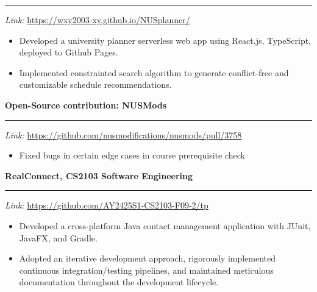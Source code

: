 \documentclass{article}
\begin{document}
\indent\rule{\linewidth}{0.4pt} %
\indent\textit{Link:} \href{https://wxy2003-xy.github.io/NUSplanner/}{https://wxy2003-xy.github.io/NUSplanner/} \\
\indent\vspace{-0.4cm} 
\begin{adjustwidth}{2.5em}{0pt}
\begin{itemize}[leftmargin=*, itemsep=1pt, parsep=0pt]
  \item \indent Developed a university planner serverless web app using React.js, TypeScript, deployed to Github Pages.
  \item \indent Implemented constrainted search algorithm to generate conflict-free and customizable schedule recommendations.
\end{itemize}
\end{adjustwidth}

\indent \textbf{Open-Source contribution: NUSMods} \\
\vspace{-0.7cm} %

\indent\rule{\linewidth}{0.4pt} %
\indent\textit{Link:} \href{https://github.com/nusmodifications/nusmods/pull/3758}{https://github.com/nusmodifications/nusmods/pull/3758} \\
\indent\vspace{-0.4cm} 
\begin{adjustwidth}{2.5em}{0pt}
\begin{itemize}[leftmargin=*, itemsep=1pt, parsep=0pt]
  \item \indent Fixed bugs in certain edge cases in course prerequisite check 
\end{itemize}
\end{adjustwidth}

\indent \textbf{RealConnect, CS2103 Software Engineering} \\
\vspace{-0.7cm} %

\indent\rule{\linewidth}{0.4pt} %
\indent\textit{Link:} \href{https://github.com/AY2425S1-CS2103-F09-2/tp}{https://github.com/AY2425S1-CS2103-F09-2/tp} \\
\vspace{-0.4cm}
\begin{adjustwidth}{2.5em}{0pt}
\begin{itemize}[leftmargin=*, itemsep=1pt, parsep=0pt]
  \item Developed a cross-platform Java contact management application with JUnit, JavaFX, and Gradle.
  \item Adopted an iterative development approach, rigorously implemented continuous integration/testing pipelines, and maintained meticulous documentation throughout the development lifecycle.
\end{itemize}
\end{adjustwidth}
\vspace{0.2cm}
\end{document}
